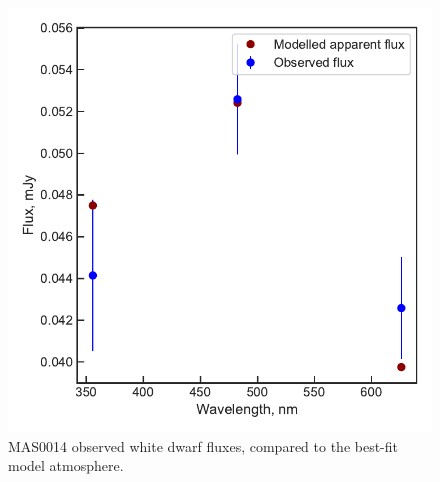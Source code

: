 \begin{figure}
    \centering
    \includegraphics[width=\textwidth]{figures/results/MASOT0014/fluxplot.pdf}
    \caption{MAS0014 observed white dwarf fluxes, compared to the best-fit model atmosphere.}
    \label{fig:MAS0014 flux plot}
\end{figure}
\clearpage


